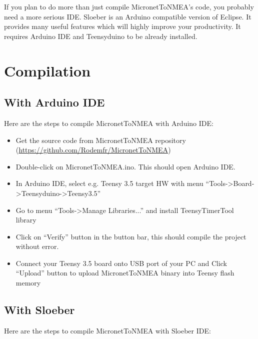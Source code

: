\documentclass{report}
\begin{document}
If you plan to do more than just compile MicronetToNMEA’s code, you probably need a more serious IDE. Sloeber is an Arduino compatible version of Eclipse. It provides many useful features which will highly improve your productivity. It requires Arduino IDE and Teensyduino to be already installed.

\chapter{Compilation}

\section{With Arduino IDE}

Here are the steps to compile MicronetToNMEA with Arduino IDE:

\begin{itemize}
\item Get the source code from MicronetToNMEA repository (\url{https://github.com/Rodemfr/MicronetToNMEA})
\item Double-click on MicronetToNMEA.ino. This should open Arduino IDE.
\item In Arduino IDE, select e.g. Teensy 3.5 target HW with menu “Tools->Board->Teensyduino->Teensy3.5”
\item Go to menu “Tools->Manage Libraries...” and install TeensyTimerTool library
\item Click on “Verify” button in the button bar, this should compile the project without error.
\item Connect your Teensy 3.5 board onto USB port of your PC and Click “Upload” button to upload MicronetToNMEA binary into Teensy flash memory
\end{itemize}

\section{With Sloeber}

Here are the steps to compile MicronetToNMEA with Sloeber IDE:
\end{document}
